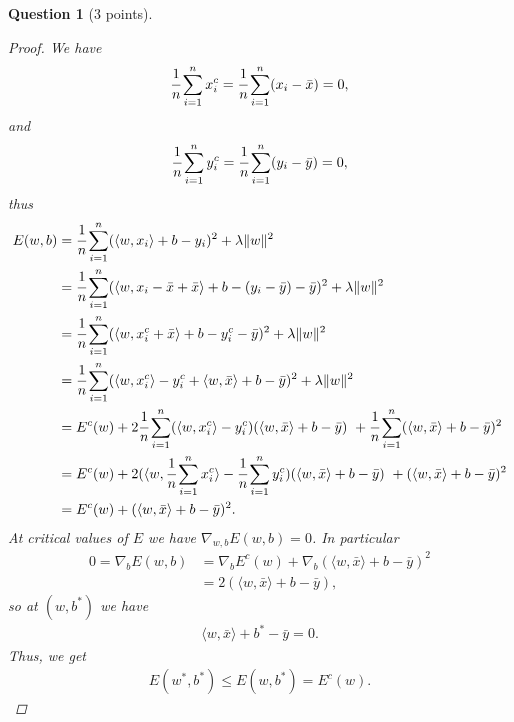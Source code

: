 \documentclass[12pt]{article}
\newcommand{\norm}[1]{\lVert #1 \rVert}
\newtheorem{question}{Question}
\begin{document}
\begin{question}[3 points]
\begin{proof}
    We have
    \begin{align*}
      \cfrac{1}{n}\sum\limits_{i=1}^nx_i^c = \cfrac{1}{n}\sum\limits_{i=1}^n(x_i - \bar{x}) = 0,
    \end{align*}
    and
    \begin{align*}
      \cfrac{1}{n}\sum\limits_{i=1}^ny_i^c = \cfrac{1}{n}\sum\limits_{i=1}^n(y_i - \bar{y}) = 0,
    \end{align*}
    thus
    \begin{align*}
      E(w,b) &= \cfrac{1}{n}\sum\limits_{i=1}^n(\langle w, x_i \rangle + b - y_i)^2 + \lambda \norm{w}^2 \\
      &= \cfrac{1}{n}\sum\limits_{i=1}^n(\langle w, x_i - \bar{x} + \bar{x} \rangle + b - (y_i - \bar{y}) -\bar{y})^2 +  \lambda \norm{w}^2 \\
      &= \cfrac{1}{n}\sum\limits_{i=1}^n(\langle w, x_i^c + \bar{x} \rangle + b - y_i^c -\bar{y})^2 +  \lambda \norm{w}^2 \\
      &= \cfrac{1}{n}\sum\limits_{i=1}^n(\langle w, x_i^c \rangle -y_i^c + \langle w, \bar{x} \rangle + b -\bar{y})^2 +  \lambda \norm{w}^2 \\
      &= E^c(w)
      + 2 \cfrac{1}{n}\sum\limits_{i=1}^n(\langle w, x_i^c \rangle -y_i^c)(\langle w, \bar{x} \rangle + b -\bar{y}) \
      + \cfrac{1}{n}\sum\limits_{i=1}^n (\langle w, \bar{x} \rangle + b -\bar{y})^2\\
      &= E^c(w)
      + 2 (\langle w, \cfrac{1}{n}\sum\limits_{i=1}^n x_i^c \rangle - \cfrac{1}{n}\sum\limits_{i=1}^n y_i^c)(\langle w, \bar{x} \rangle + b -\bar{y}) \
      + (\langle w, \bar{x} \rangle + b -\bar{y})^2 \\
      &= E^c(w) + (\langle w, \bar{x} \rangle + b -\bar{y})^2.
    \end{align*}
    At critical values of $E$ we have $\nabla_{w,b}E(w,b) = 0$. In particular
    \begin{align*}
      0 = \nabla_bE(w,b)
      &= \nabla_b E^c(w) + \nabla_b (\langle w, \bar{x} \rangle + b -\bar{y})^2 \\
      &= 2(\langle w, \bar{x} \rangle + b -\bar{y}),
    \end{align*}
    so at $(w, b^*)$ we have
    \begin{align*}
      \langle w, \bar{x} \rangle + b^* -\bar{y} = 0.
    \end{align*}
    Thus, we get
    \begin{align*}
      E(w^*,b^*)  \leq E(w,b^*) = E^c(w).
    \end{align*}

\end{proof}
\end{question}
\end{document}
